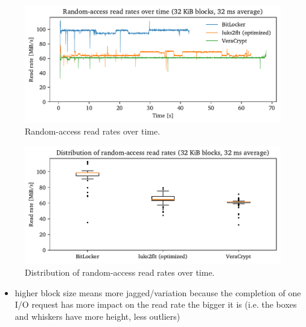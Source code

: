 \begin{figure}[htb!]
	\center
	\includegraphics[scale=1]{../fig/performance.hwexperiments.randovertime.pdf}
	\caption[
		Random-access read rates over time
	]{
		Random-access read rates over time.  
	}
	\label{fig:performance.hwexperiments.randovertime}
\end{figure}

\begin{figure}[htb!]
	\center
	\includegraphics[scale=1]{../fig/performance.hwexperiments.randovertimebox.pdf}
	\caption[
		Distribution of random-access read rates over time
	]{
		Distribution of random-access read rates over time. 
	}
	\label{fig:performance.hwexperiments.randovertimebox}
\end{figure}

\begin{itemize}
	\item higher block size means more jagged/variation because the completion of one I/O request has more impact on the read rate the bigger it is (i.e. the boxes and whiskers have more height, less outliers)
\end{itemize}